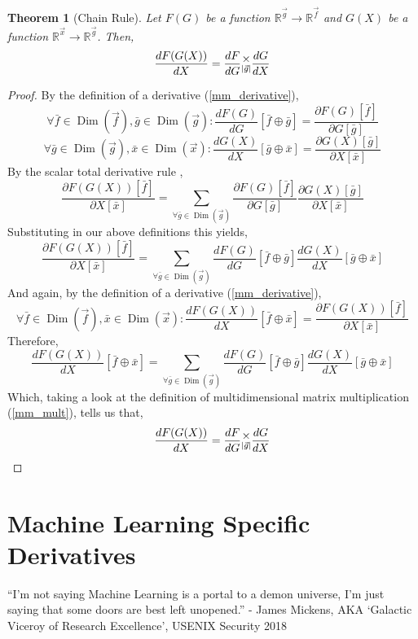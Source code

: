 \documentclass[12pt]{book}
\theoremstyle{definition}
\theoremstyle{plain}
\newtheorem{theorem}{Theorem}[chapter]
\theoremstyle{ppart}
\theoremstyle{case}
\theoremstyle{solution}
\DeclareMathOperator{\Dim}{Dim}
\newcommand{\mmult}[1]{\text{\raisebox{1ex}{$\underset{#1}{\times}$}}}
\begin{document}
\begin{theorem}[Chain Rule]
\label{mmm_chain_rule}
Let $F(G)$ be a function $\mathbb{R}^{\vec{g}} \rightarrow \mathbb{R}^{\vec{f}}$
and $G(X)$ be a function $\mathbb{R}^{\vec{x}} \rightarrow \mathbb{R}^{\vec{g}}$.
Then,
\[
\frac{dF(G(X))}{dX} = \frac{dF}{dG} \mmult{|\vec{g}|} \frac{dG}{dX}
\]
\end{theorem}
\begin{proof}
By the definition of a derivative (\ref{mm_derivative}),
\[
\forall \bar{f} \in \Dim(\vec{f}), \bar{g} \in \Dim(\vec{g}):
\frac{dF(G)}{dG}[\bar{f} \oplus \bar{g}]
= \frac{\partial F(G)[\bar{f}]}{\partial G[\bar{g}]}
\]
\[
\forall \bar{g} \in \Dim(\vec{g}), \bar{x} \in \Dim(\vec{x}):
\frac{dG(X)}{dX}[\bar{g} \oplus \bar{x}]
= \frac{\partial G(X)[\bar{g}]}{\partial X[\bar{x}]}
\]
By the scalar total derivative rule \cite{wiki:totalderiv},
\[
\frac{\partial F(G(X))[\bar{f}]}{\partial X[\bar{x}]}
= \sum_{\forall \bar{g} \in \Dim(\vec{g})} 
\frac{\partial F(G)[\bar{f}]}{\partial G[\bar{g}]}
\frac{\partial G(X)[\bar{g}]}{\partial X[\bar{x}]}
\]
Substituting in our above definitions this yields,
\[
\frac{\partial F(G(X))[\bar{f}]}{\partial X[\bar{x}]}
= \sum_{\forall \bar{g} \in \Dim(\vec{g})} 
\frac{dF(G)}{dG}[\bar{f} \oplus \bar{g}]
\frac{dG(X)}{dX}[\bar{g} \oplus \bar{x}]
\]
And again, by the definition of a derivative (\ref{mm_derivative}),
\[
\forall \bar{f} \in \Dim(\vec{f}), \bar{x} \in \Dim(\vec{x}):
\frac{dF(G(X))}{dX}[\bar{f} \oplus \bar{x}]
= \frac{\partial F(G(X))[\bar{f}]}{\partial X[\bar{x}]}
\]
Therefore,
\[
\frac{dF(G(X))}{dX}[\bar{f} \oplus \bar{x}]
= \sum_{\forall \bar{g} \in \Dim(\vec{g})} 
\frac{dF(G)}{dG}[\bar{f} \oplus \bar{g}]
\frac{dG(X)}{dX}[\bar{g} \oplus \bar{x}]
\]
Which, taking a look at the definition of multidimensional matrix multiplication
(\ref{mm_mult}), tells us that,
\[
\frac{dF(G(X))}{dX} = \frac{dF}{dG} \mmult{|\vec{g}|} \frac{dG}{dX}
\]
\end{proof}

\chapter{Machine Learning Specific Derivatives}

\begin{displayquote}
``I'm not saying Machine Learning is a portal to a demon universe, I'm just saying
that some doors are best left unopened.'' - James Mickens, AKA `Galactic Viceroy of Research Excellence', USENIX Security 2018
\end{displayquote}
\end{document}
